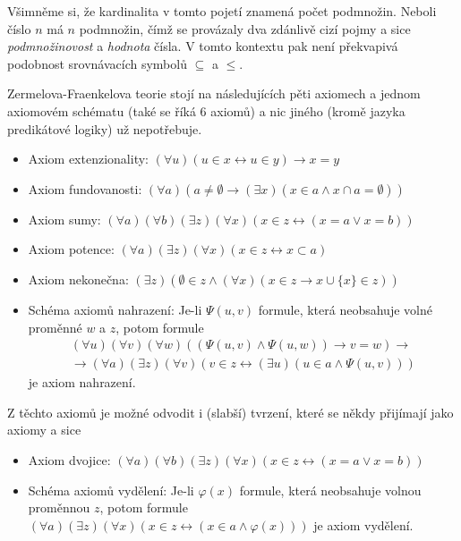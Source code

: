 \begin{remark}\label{pozn:kard_podm}
Všimněme si, že kardinalita v tomto pojetí znamená počet podmnožin. Neboli číslo $n$ má $n$ podmnožin, čímž se provázaly dva zdánlivě cizí pojmy a sice \textit{podmnožinovost} a \textit{hodnota} čísla. V tomto kontextu pak není překvapivá podobnost srovnávacích symbolů $\subseteq$ a $\leq$.
\end{remark}

Zermelova-Fraenkelova teorie stojí na následujících pěti axiomech a jednom axiomovém schématu (také se říká 6 axiomů) a nic jiného (kromě jazyka predikátové logiky) už nepotřebuje.
\begin{itemize}
\item Axiom extenzionality: $(\forall u)(u \in x \leftrightarrow u \in y) \rightarrow x = y$
\item Axiom fundovanosti: $ (\forall a)(a \neq \emptyset \rightarrow (\exists x)(x \in a \land x \cap a = \emptyset))$
\item Axiom sumy: $(\forall a)(\forall b)(\exists z)(\forall x)(x \in z \leftrightarrow (x = a \lor x = b))$
\item Axiom potence: $(\forall a)(\exists z)(\forall x)(x \in z \leftrightarrow x \subset a)$
\item Axiom nekonečna: $(\exists z)(\emptyset \in z \land (\forall x)(x \in z \rightarrow x \cup \{ x \} \in z))$
\item Schéma axiomů nahrazení: Je-li $\Psi (u, v)$ formule, která neobsahuje volné proměnné $w$ a $z$, potom formule $$\begin{aligned}(\forall u)(\forall v)(\forall w)((\Psi (u,v) \land \Psi (u, w)) \rightarrow v = w) \rightarrow \\ \rightarrow (\forall a)(\exists z)(\forall v)(v \in z \leftrightarrow (\exists u)(u \in a \land \Psi (u,v))) \end{aligned}$$ je axiom nahrazení.
\end{itemize}

Z těchto axiomů je možné odvodit i (slabší) tvrzení, které se někdy přijímají jako axiomy a sice
\begin{itemize}
\item Axiom dvojice: $(\forall a)(\forall b)(\exists z)(\forall x)(x \in z \leftrightarrow (x = a \lor x = b))$
\item Schéma axiomů vydělení: Je-li $\varphi (x)$ formule, která neobsahuje volnou proměnnou $z$, potom formule $(\forall a)(\exists z)(\forall x)(x \in z \leftrightarrow  (x \in a \land \varphi (x)))$ je axiom vydělení.
\end{itemize}


